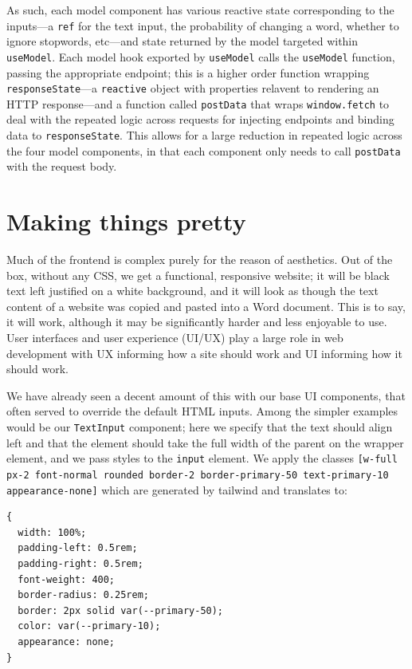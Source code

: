 \documentclass[11pt, twoside, reqno]{book}
\begin{document}
As such, each model component has various reactive state corresponding to the inputs—a \texttt{ref} for the text input, the probability of changing a word, whether to ignore stopwords, etc—and state returned by the model targeted within \texttt{useModel}. Each model hook exported by \texttt{useModel} calls the \texttt{useModel} function, passing the appropriate endpoint; this is a higher order function wrapping \texttt{responseState}—a \texttt{reactive} object with properties relavent to rendering an HTTP response—and a function called \texttt{postData} that wraps \texttt{window.fetch} to deal with the repeated logic across requests for injecting endpoints and binding data to \texttt{responseState}. This allows for a large reduction in repeated logic across the four model components, in that each component only needs to call \texttt{postData} with the request body.

\section{Making things pretty}

Much of the frontend is complex purely for the reason of aesthetics. Out of the box, without any CSS, we get a functional, responsive website; it will be black text left justified on a white background, and it will look as though the text content of a website was copied and pasted into a Word document. This is to say, it will work, although it may be significantly harder and less enjoyable to use. User interfaces and user experience (UI/UX) play a large role in web development with UX informing how a site should work and UI informing how it should work.

We have already seen a decent amount of this with our base UI components, that often served to override the default HTML inputs. Among the simpler examples would be our \texttt{TextInput} component; here we specify that the text should align left and that the element should take the full width of the parent on the wrapper element, and we pass styles to the \texttt{input} element. We apply the classes \texttt{[w-full px-2 font-normal rounded border-2 border-primary-50 text-primary-10 appearance-none]} which are generated by tailwind and translates to:
\begin{lstlisting}[language=XML]
{
  width: 100%;
  padding-left: 0.5rem; 
  padding-right: 0.5rem;
  font-weight: 400;
  border-radius: 0.25rem;
  border: 2px solid var(--primary-50);
  color: var(--primary-10);
  appearance: none;
}
\end{lstlisting}
\end{document}
